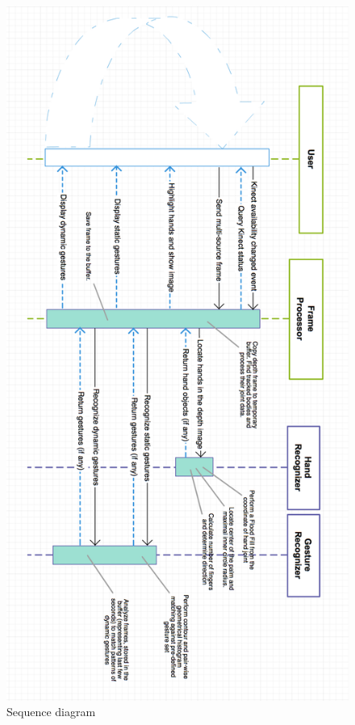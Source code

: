 \documentclass[a4paper,11pt,oneside]{article}
\begin{document}
\begin{figure}[H]
\centering
\includegraphics[scale=0.55]{sequence-dia.png}
\caption{Sequence diagram}
\end{figure}

\renewcommand{\refname}{\section{References}}



\end{document}
